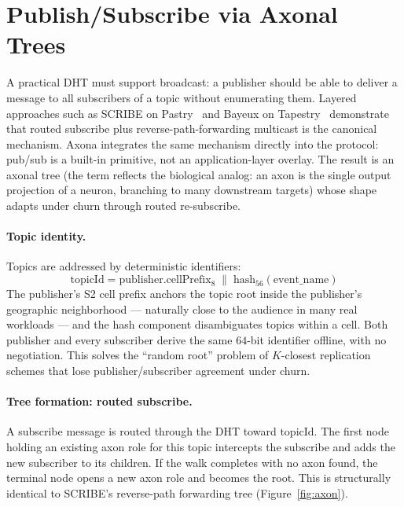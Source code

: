 \documentclass[conference]{IEEEtran}
\newcommand{\axona}{Axona\xspace}
\begin{document}
\section{Publish/Subscribe via Axonal Trees}
\label{sec:pubsub}

A practical DHT must support broadcast: a publisher should be able to
deliver a message to all subscribers of a topic without enumerating them.
Layered approaches such as SCRIBE on Pastry~\cite{castro2002scribe} and
Bayeux on Tapestry~\cite{zhuang2001bayeux} demonstrate that routed
subscribe plus reverse-path-forwarding multicast is the canonical
mechanism. \axona integrates the same mechanism directly into the
protocol: pub/sub is a built-in primitive, not an application-layer
overlay. The result is an axonal tree (the term reflects the biological
analog: an axon is the single output projection of a neuron, branching
to many downstream targets) whose shape adapts under churn through
routed re-subscribe.

\paragraph{Topic identity.}
Topics are addressed by deterministic identifiers:
\[
\mathrm{topicId} = \mathrm{publisher}.\mathrm{cellPrefix}_{8} \;\|\; \mathrm{hash}_{56}(\mathrm{event\_name})
\]
The publisher's S2 cell prefix anchors the topic root inside the
publisher's geographic neighborhood --- naturally close to the audience
in many real workloads --- and the hash component disambiguates topics
within a cell. Both publisher and every subscriber derive the same
$64$-bit identifier offline, with no negotiation. This solves the
``random root'' problem of $K$-closest replication schemes that lose
publisher/subscriber agreement under churn.

\paragraph{Tree formation: routed subscribe.}
A subscribe message is routed through the DHT toward
$\mathrm{topicId}$. The first node holding an existing axon role for
this topic intercepts the subscribe and adds the new subscriber to its
children. If the walk completes with no axon found, the terminal node
opens a new axon role and becomes the root. This is structurally
identical to SCRIBE's reverse-path forwarding tree
(Figure~\ref{fig:axon}).
\end{document}
